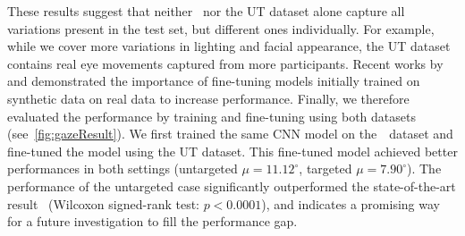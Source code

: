 These results suggest that neither \dataset~nor the UT dataset alone capture all variations present in the test set, but different ones individually.
For example, while we cover more variations in lighting and facial appearance, the UT dataset contains real eye movements captured from more participants.
Recent works by \citet{fu2011neural} and \citet{peng2014exploring} demonstrated the importance of fine-tuning models initially trained on synthetic data on real data to increase performance.
Finally, we therefore evaluated the performance by training and fine-tuning using both datasets (see~\autoref{fig:gazeResult}).
We first trained the same CNN model on the~\dataset~dataset and fine-tuned the model using the UT dataset.
This fine-tuned model achieved better performances in both settings (untargeted $\mu\!=\!11.12^{\circ}$, targeted $\mu\!=\!7.90^{\circ}$).
The performance of the untargeted case significantly outperformed the state-of-the-art result~\cite{zhang15_cvpr} (Wilcoxon signed-rank test: $p\!<\!0.0001$), and indicates a promising way for a future investigation to fill the performance gap.


